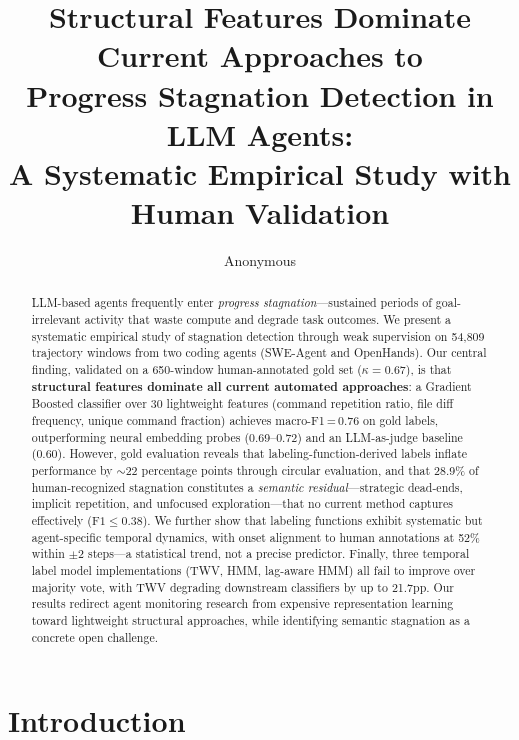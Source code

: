 \documentclass[11pt]{article}
\title{Structural Features Dominate Current Approaches to\\Progress Stagnation Detection in LLM Agents:\\A Systematic Empirical Study with Human Validation}
\author{Anonymous}
\date{}
\begin{document}
\maketitle

\begin{abstract}

LLM-based agents frequently enter \emph{progress stagnation}---sustained periods of goal-irrelevant activity that waste compute and degrade task outcomes. We present a systematic empirical study of stagnation detection through weak supervision on 54,809 trajectory windows from two coding agents (SWE-Agent and OpenHands). Our central finding, validated on a 650-window human-annotated gold set ($\kappa\!=\!0.67$), is that \textbf{structural features dominate all current automated approaches}: a Gradient Boosted classifier over 30 lightweight features (command repetition ratio, file diff frequency, unique command fraction) achieves macro-F1\,=\,0.76 on gold labels, outperforming neural embedding probes (0.69--0.72) and an LLM-as-judge baseline (0.60). However, gold evaluation reveals that labeling-function-derived labels inflate performance by $\sim$22 percentage points through circular evaluation, and that 28.9\% of human-recognized stagnation constitutes a \emph{semantic residual}---strategic dead-ends, implicit repetition, and unfocused exploration---that no current method captures effectively ($\text{F1}\!\leq\!0.38$). We further show that labeling functions exhibit systematic but agent-specific temporal dynamics, with onset alignment to human annotations at 52\% within $\pm$2 steps---a statistical trend, not a precise predictor. Finally, three temporal label model implementations (TWV, HMM, lag-aware HMM) all fail to improve over majority vote, with TWV degrading downstream classifiers by up to 21.7pp. Our results redirect agent monitoring research from expensive representation learning toward lightweight structural approaches, while identifying semantic stagnation as a concrete open challenge.

\end{abstract}

\section{Introduction}
\label{sec:intro}
\end{document}

